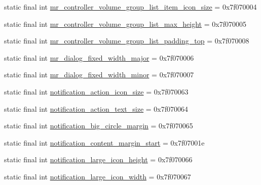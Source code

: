 \begin{CompactItemize}
\item 
static final int \hyperlink{classandroid_1_1support_1_1graphics_1_1drawable_1_1animated_1_1_r_1_1dimen_e372bb21779c58bf4fdd4ef13a32d5d5}{mr\_\-controller\_\-volume\_\-group\_\-list\_\-item\_\-icon\_\-size} = 0x7f070004
\item 
static final int \hyperlink{classandroid_1_1support_1_1graphics_1_1drawable_1_1animated_1_1_r_1_1dimen_2ff9c8ebc7f71fc549188e01b41e870c}{mr\_\-controller\_\-volume\_\-group\_\-list\_\-max\_\-height} = 0x7f070005
\item 
static final int \hyperlink{classandroid_1_1support_1_1graphics_1_1drawable_1_1animated_1_1_r_1_1dimen_c6cc7fde6f5160888080b97d9ba8090b}{mr\_\-controller\_\-volume\_\-group\_\-list\_\-padding\_\-top} = 0x7f070008
\item 
static final int \hyperlink{classandroid_1_1support_1_1graphics_1_1drawable_1_1animated_1_1_r_1_1dimen_a05ad59264f045e630746522763e58f4}{mr\_\-dialog\_\-fixed\_\-width\_\-major} = 0x7f070006
\item 
static final int \hyperlink{classandroid_1_1support_1_1graphics_1_1drawable_1_1animated_1_1_r_1_1dimen_a67a2c649a921bfb981bbb0768abfd05}{mr\_\-dialog\_\-fixed\_\-width\_\-minor} = 0x7f070007
\item 
static final int \hyperlink{classandroid_1_1support_1_1graphics_1_1drawable_1_1animated_1_1_r_1_1dimen_936e6ace97336b1390aea7b3a4cea566}{notification\_\-action\_\-icon\_\-size} = 0x7f070063
\item 
static final int \hyperlink{classandroid_1_1support_1_1graphics_1_1drawable_1_1animated_1_1_r_1_1dimen_bd99f84f13c7cf5eb72aa27498ba79ce}{notification\_\-action\_\-text\_\-size} = 0x7f070064
\item 
static final int \hyperlink{classandroid_1_1support_1_1graphics_1_1drawable_1_1animated_1_1_r_1_1dimen_49ad4049c261f36130ac820b52267a2f}{notification\_\-big\_\-circle\_\-margin} = 0x7f070065
\item 
static final int \hyperlink{classandroid_1_1support_1_1graphics_1_1drawable_1_1animated_1_1_r_1_1dimen_9e92bef974ff0084581890983252ce1f}{notification\_\-content\_\-margin\_\-start} = 0x7f07001e
\item 
static final int \hyperlink{classandroid_1_1support_1_1graphics_1_1drawable_1_1animated_1_1_r_1_1dimen_a649691212528a0da469e7f4a8fecffc}{notification\_\-large\_\-icon\_\-height} = 0x7f070066
\item 
static final int \hyperlink{classandroid_1_1support_1_1graphics_1_1drawable_1_1animated_1_1_r_1_1dimen_a0c6c3ad05e17c9207d3d68edbb90734}{notification\_\-large\_\-icon\_\-width} = 0x7f070067

\end{CompactItemize}
